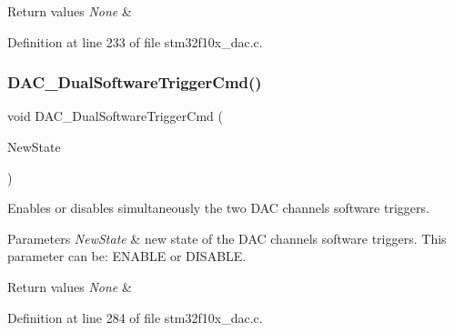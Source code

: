 \begin{DoxyRetVals}{Return values}
{\em None} & \\
\hline
\end{DoxyRetVals}


Definition at line 233 of file stm32f10x\+\_\+dac.\+c.

\mbox{\label{group___d_a_c___exported___functions_gab4d3b364a6b184dcd65f3b294ebf56dc}} 
\subsubsection{\texorpdfstring{D\+A\+C\+\_\+\+Dual\+Software\+Trigger\+Cmd()}{DAC\_DualSoftwareTriggerCmd()}}
{\footnotesize\ttfamily void D\+A\+C\+\_\+\+Dual\+Software\+Trigger\+Cmd (\begin{DoxyParamCaption}\item[{\hyperlink{group___exported__types_gac9a7e9a35d2513ec15c3b537aaa4fba1}{Functional\+State}}]{New\+State }\end{DoxyParamCaption})}



Enables or disables simultaneously the two D\+AC channels software triggers. 


\begin{DoxyParams}{Parameters}
{\em New\+State} & new state of the D\+AC channels software triggers. This parameter can be\+: E\+N\+A\+B\+LE or D\+I\+S\+A\+B\+LE. \\
\hline
\end{DoxyParams}

\begin{DoxyRetVals}{Return values}
{\em None} & \\
\hline
\end{DoxyRetVals}


Definition at line 284 of file stm32f10x\+\_\+dac.\+c.

\mbox{\label{group___d_a_c___exported___functions_ga51274838de1e5dd012a82d7f44d7a50b}} 
